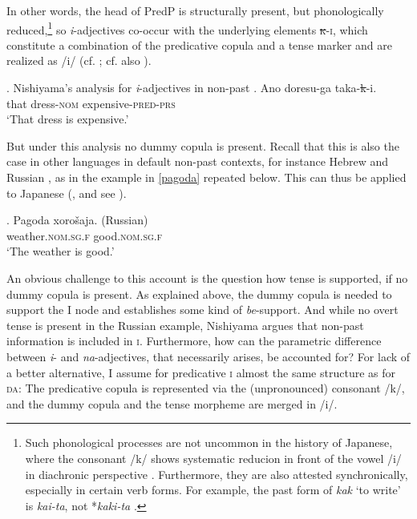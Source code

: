 In other words, the head of PredP is structurally present, but phonologically reduced,\footnote{Such phonological processes are not uncommon in the history of Japanese, where the consonant /k/ shows systematic reducion in front of the vowel /i/ in diachronic perspective \citep[340]{frellesvig:2010:history}. Furthermore, they are also attested synchronically, especially in certain verb forms. For example, the past form of \textit{kak} `to write' is \textit{kai-ta}, not *\textit{kaki-ta} \citep[191]{nishiyama:1999:adj}.} so \textit{i}-adjectives co-occur with the underlying elements \textsc{\st{k}-i}, which constitute a combination of the predicative copula and a tense marker and are realized as /i/ (cf. \citealt[199–201]{nishiyama:1999:adj}; cf. also \citealt[2]{baker:2003:verbal}).

\ex. Nishiyama's analysis for \textit{i}-adjectives in non-past
\ag. Ano doresu-ga taka-\st{k}-i.\\
that dress-\textsc{nom} expensive-\textsc{pred-prs}\\
`That dress is expensive.'

But under this analysis no dummy copula is present. Recall that this is also the case in other languages in default non-past contexts, for instance  Hebrew \citep{doron:1983:verbless, rapoport:1987:copular} and Russian \citep{babby:2010:syntactic}, as in the example in \ref{pagoda} repeated below. This can thus be applied to Japanese (\citealt[191–192]{nishiyama:1999:adj}, and see \citealt{urushibara:1993:syntactic}).

\exg. Pagoda xorošaja. (Russian)\\
weather.\textsc{nom.sg.f} good.\textsc{nom.sg.f}\\
`The weather is good.'

An obvious challenge to this account is the question how tense is supported, if no dummy copula is present. As explained above, the dummy copula is needed to support the I node and establishes some kind of \textit{be}-support. And while no overt tense is present in the Russian example, Nishiyama argues that non-past information is included in \textsc{i}. Furthermore, how can the parametric difference between \textit{i}- and \textit{na}-adjectives, that necessarily arises, be accounted for? For lack of a better alternative, I assume for predicative \textsc{i} almost the same structure as for \textsc{da}: The predicative copula is represented via the (unpronounced) consonant /k/, and the dummy copula and the tense morpheme are merged in /i/. 

